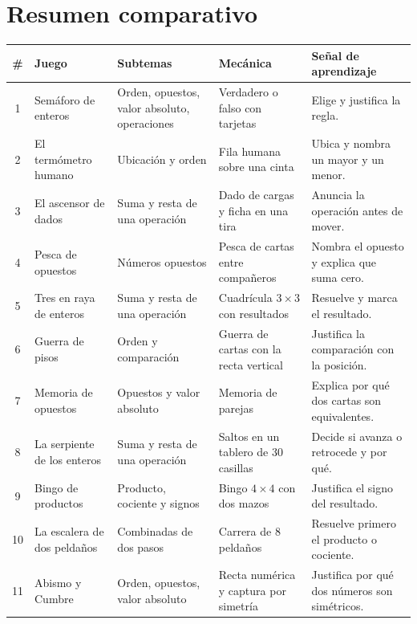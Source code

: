 \documentclass[12pt, letterpaper]{article}
\begin{document}
\appendix
\clearpage

\section{Resumen comparativo}

\begin{center}
\footnotesize
\begin{tabular}{@{}c l p{3.0cm} p{3.4cm} p{3.6cm}@{}}
\toprule
\textbf{\#} & \textbf{Juego} & \textbf{Subtemas} & \textbf{Mecánica} & \textbf{Señal de aprendizaje}\\
\midrule
1 & Semáforo de enteros & Orden, opuestos, valor absoluto, operaciones & Verdadero o falso con tarjetas & Elige y justifica la regla.\\
2 & El termómetro humano & Ubicación y orden & Fila humana sobre una cinta & Ubica y nombra un mayor y un menor.\\
3 & El ascensor de dados & Suma y resta de una operación & Dado de cargas y ficha en una tira & Anuncia la operación antes de mover.\\
4 & Pesca de opuestos & Números opuestos & Pesca de cartas entre compañeros & Nombra el opuesto y explica que suma cero.\\
5 & Tres en raya de enteros & Suma y resta de una operación & Cuadrícula $3\times 3$ con resultados & Resuelve y marca el resultado.\\
6 & Guerra de pisos & Orden y comparación & Guerra de cartas con la recta vertical & Justifica la comparación con la posición.\\
7 & Memoria de opuestos & Opuestos y valor absoluto & Memoria de parejas & Explica por qué dos cartas son equivalentes.\\
8 & La serpiente de los enteros & Suma y resta de una operación & Saltos en un tablero de 30 casillas & Decide si avanza o retrocede y por qué.\\
9 & Bingo de productos & Producto, cociente y signos & Bingo $4\times 4$ con dos mazos & Justifica el signo del resultado.\\
10 & La escalera de dos peldaños & Combinadas de dos pasos & Carrera de 8 peldaños & Resuelve primero el producto o cociente.\\
11 & Abismo y Cumbre & Orden, opuestos, valor absoluto & Recta numérica y captura por simetría & Justifica por qué dos números son simétricos.\\

\end{tabular}
\end{center}
\end{document}
